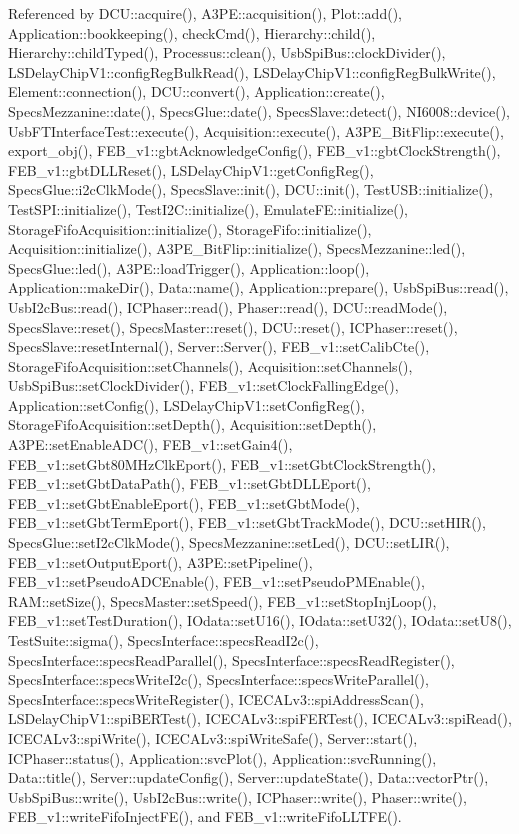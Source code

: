 Referenced by DCU::acquire(), A3PE::acquisition(), Plot::add(), Application::bookkeeping(), checkCmd(), Hierarchy::child(), Hierarchy::childTyped(), Processus::clean(), UsbSpiBus::clockDivider(), LSDelayChipV1::configRegBulkRead(), LSDelayChipV1::configRegBulkWrite(), Element::connection(), DCU::convert(), Application::create(), SpecsMezzanine::date(), SpecsGlue::date(), SpecsSlave::detect(), NI6008::device(), UsbFTInterfaceTest::execute(), Acquisition::execute(), A3PE\_\-BitFlip::execute(), export\_\-obj(), FEB\_\-v1::gbtAcknowledgeConfig(), FEB\_\-v1::gbtClockStrength(), FEB\_\-v1::gbtDLLReset(), LSDelayChipV1::getConfigReg(), SpecsGlue::i2cClkMode(), SpecsSlave::init(), DCU::init(), TestUSB::initialize(), TestSPI::initialize(), TestI2C::initialize(), EmulateFE::initialize(), StorageFifoAcquisition::initialize(), StorageFifo::initialize(), Acquisition::initialize(), A3PE\_\-BitFlip::initialize(), SpecsMezzanine::led(), SpecsGlue::led(), A3PE::loadTrigger(), Application::loop(), Application::makeDir(), Data::name(), Application::prepare(), UsbSpiBus::read(), UsbI2cBus::read(), ICPhaser::read(), Phaser::read(), DCU::readMode(), SpecsSlave::reset(), SpecsMaster::reset(), DCU::reset(), ICPhaser::reset(), SpecsSlave::resetInternal(), Server::Server(), FEB\_\-v1::setCalibCte(), StorageFifoAcquisition::setChannels(), Acquisition::setChannels(), UsbSpiBus::setClockDivider(), FEB\_\-v1::setClockFallingEdge(), Application::setConfig(), LSDelayChipV1::setConfigReg(), StorageFifoAcquisition::setDepth(), Acquisition::setDepth(), A3PE::setEnableADC(), FEB\_\-v1::setGain4(), FEB\_\-v1::setGbt80MHzClkEport(), FEB\_\-v1::setGbtClockStrength(), FEB\_\-v1::setGbtDataPath(), FEB\_\-v1::setGbtDLLEport(), FEB\_\-v1::setGbtEnableEport(), FEB\_\-v1::setGbtMode(), FEB\_\-v1::setGbtTermEport(), FEB\_\-v1::setGbtTrackMode(), DCU::setHIR(), SpecsGlue::setI2cClkMode(), SpecsMezzanine::setLed(), DCU::setLIR(), FEB\_\-v1::setOutputEport(), A3PE::setPipeline(), FEB\_\-v1::setPseudoADCEnable(), FEB\_\-v1::setPseudoPMEnable(), RAM::setSize(), SpecsMaster::setSpeed(), FEB\_\-v1::setStopInjLoop(), FEB\_\-v1::setTestDuration(), IOdata::setU16(), IOdata::setU32(), IOdata::setU8(), TestSuite::sigma(), SpecsInterface::specsReadI2c(), SpecsInterface::specsReadParallel(), SpecsInterface::specsReadRegister(), SpecsInterface::specsWriteI2c(), SpecsInterface::specsWriteParallel(), SpecsInterface::specsWriteRegister(), ICECALv3::spiAddressScan(), LSDelayChipV1::spiBERTest(), ICECALv3::spiFERTest(), ICECALv3::spiRead(), ICECALv3::spiWrite(), ICECALv3::spiWriteSafe(), Server::start(), ICPhaser::status(), Application::svcPlot(), Application::svcRunning(), Data::title(), Server::updateConfig(), Server::updateState(), Data::vectorPtr(), UsbSpiBus::write(), UsbI2cBus::write(), ICPhaser::write(), Phaser::write(), FEB\_\-v1::writeFifoInjectFE(), and FEB\_\-v1::writeFifoLLTFE().


